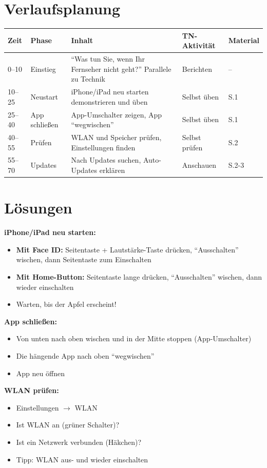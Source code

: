\documentclass[11pt,a4paper]{article}
\begin{document}
\section{Verlaufsplanung}

\begin{longtable}{|p{1cm}|p{2cm}|p{5cm}|p{3cm}|p{2cm}|}
\hline
\textbf{Zeit} & \textbf{Phase} & \textbf{Inhalt} & \textbf{TN-Aktivität} & \textbf{Material} \\
\hline
0--10 & Einstieg & ``Was tun Sie, wenn Ihr Fernseher nicht geht?'' Parallele zu Technik & Berichten & -- \\
\hline
10--25 & Neustart & iPhone/iPad neu starten demonstrieren und üben & Selbst üben & S.1 \\
\hline
25--40 & App schließen & App-Umschalter zeigen, App ``wegwischen'' & Selbst üben & S.1 \\
\hline
40--55 & Prüfen & WLAN und Speicher prüfen, Einstellungen finden & Selbst prüfen & S.2 \\
\hline
55--70 & Updates & Nach Updates suchen, Auto-Updates erklären & Anschauen & S.2-3 \\
\hline
\end{longtable}

\section{Lösungen}

\textbf{iPhone/iPad neu starten:}
\begin{itemize}
    \item \textbf{Mit Face ID:} Seitentaste + Lautstärke-Taste drücken, ``Ausschalten'' wischen, dann Seitentaste zum Einschalten
    \item \textbf{Mit Home-Button:} Seitentaste lange drücken, ``Ausschalten'' wischen, dann wieder einschalten
    \item Warten, bis der Apfel erscheint!
\end{itemize}

\textbf{App schließen:}
\begin{itemize}
    \item Von unten nach oben wischen und in der Mitte stoppen (App-Umschalter)
    \item Die hängende App nach oben ``wegwischen''
    \item App neu öffnen
\end{itemize}

\textbf{WLAN prüfen:}
\begin{itemize}
    \item Einstellungen $\rightarrow$ WLAN
    \item Ist WLAN an (grüner Schalter)?
    \item Ist ein Netzwerk verbunden (Häkchen)?
    \item Tipp: WLAN aus- und wieder einschalten
\end{itemize}
\end{document}
